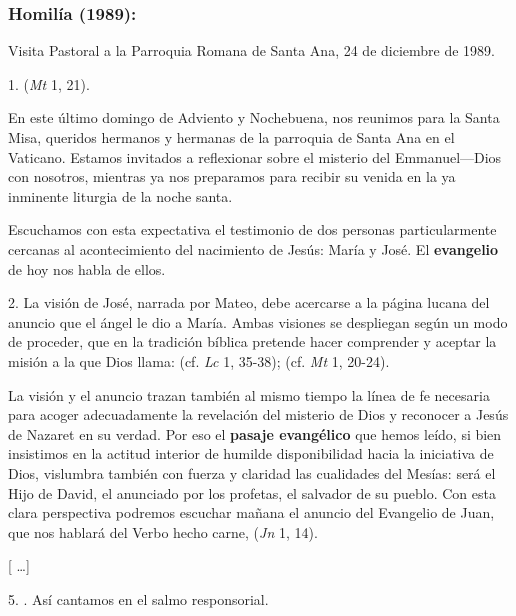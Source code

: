 \begin{body}
	\subsubsection{Homilía (1989):}

	Visita Pastoral a la Parroquia Romana de Santa Ana, 24 de diciembre de 1989.

	\begin{body}
		1.  (\emph{Mt} 1, 21).

		En este último domingo de Adviento y Nochebuena, nos reunimos para la Santa Misa, queridos hermanos y hermanas de la parroquia de Santa Ana en el Vaticano. Estamos invitados a reflexionar sobre el misterio del Emmanuel---Dios con nosotros, mientras ya nos preparamos para recibir su venida en la ya inminente liturgia de la noche santa.

		Escuchamos con esta expectativa el testimonio de dos personas particularmente cercanas al acontecimiento del nacimiento de Jesús: María y José. El \textbf{evangelio} de hoy nos habla de ellos.

		2. La visión de José, narrada por Mateo, debe acercarse a la página lucana del anuncio que el ángel le dio a María. Ambas visiones se despliegan según un modo de proceder, que en la tradición bíblica pretende hacer comprender y aceptar la misión a la que Dios llama:  (cf. \emph{Lc} 1, 35-38);  (cf. \emph{Mt} 1, 20-24).

		La visión y el anuncio trazan también al mismo tiempo la línea de fe necesaria para acoger adecuadamente la revelación del misterio de Dios y reconocer a Jesús de Nazaret en su verdad. Por eso el \textbf{pasaje evangélico} que hemos leído, si bien insistimos en la actitud interior de humilde disponibilidad hacia la iniciativa de Dios, vislumbra también con fuerza y ​​claridad las cualidades del Mesías: será el Hijo de David, el anunciado por los profetas, el salvador de su pueblo. Con esta clara perspectiva podremos escuchar mañana el anuncio del Evangelio de Juan, que nos hablará del Verbo hecho carne,  (\emph{Jn} 1, 14).

		{[} \ldots{}{]}

		5. . Así cantamos en el salmo responsorial.


\end{body}
\end{body}
